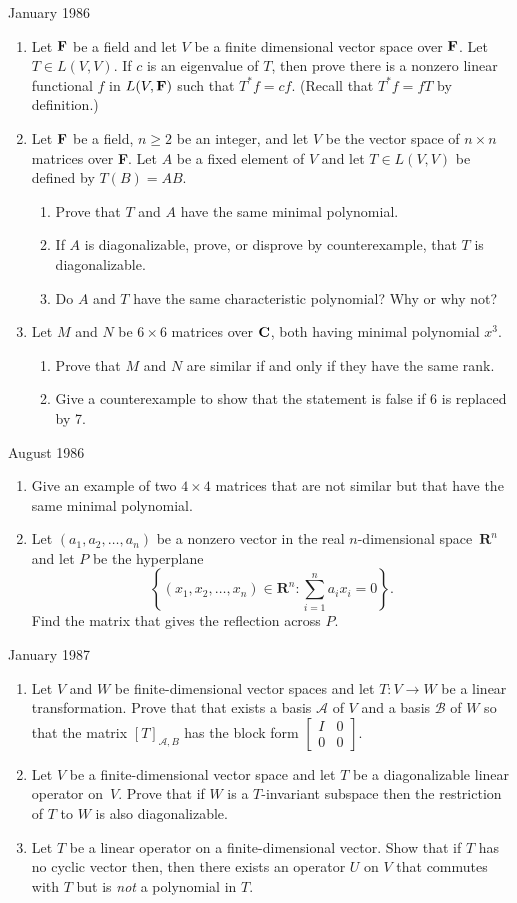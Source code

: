 \documentclass[11pt]{amsart}
\renewcommand{\(}{\left(}
\renewcommand{\)}{\right)}
\renewcommand{\[}{\left[}
\renewcommand{\]}{\right]}
\newcommand{\cn}{\mbox{\bf C}}
\newcommand{\cd}{,\ldots,}
\newcommand{\R}{{\mathbf R}}
\newcommand{\heading}[1]{\centerline{\large\sc #1}}
\newcommand{\num}{\begin{enumerate}}
\newcommand{\enum}{\end{enumerate}}
\newcommand{\fe}{{\bf F}}
\begin{document}
\heading{January 1986}
\num
\item Let $\fe$ be a field and let $V$ be a finite dimensional vector
space over $\fe$.  Let $T\in L(V,V)$.  If $c$ is an eigenvalue of $T$,
then prove there is a nonzero linear functional $f$ in $L(V,\fe)$ such
that $T^*f=cf$. (Recall that $T^*f=fT$ by definition.)
\item Let $\fe$ be a field, $n\ge 2$ be an integer, and let $V$ be the
vector space of $n\times n$ matrices over \fe.  Let $A$ be a fixed
element of $V$ and let $T\in L(V,V)$ be defined by $T(B)=AB$.
\num
\item Prove that $T$ and $A$ have the same minimal polynomial.
\item If $A$ is diagonalizable, prove, or disprove by counterexample,
that $T$ is diagonalizable.
\item Do $A$ and $T$ have the same characteristic polynomial?  Why or
why not?
\enum
\item Let $M$ and $N$ be $6\times 6$ matrices over $\cn$, both having
minimal polynomial $x^3$.
\num
\item Prove that $M$ and $N$ are similar if and only if they have the
same rank.
\item Give a counterexample to show that the statement is false if 6
is replaced by 7.
\enum
\enum
\heading{ August 1986} 
\num
\item Give an example of two $4\times 4$ matrices that are not similar
but that have the same minimal polynomial.
\item Let $(a_1,a_2\cd a_n)$ be a nonzero vector in the real
$n$-dimensional space~$\R^n$ and let $P$ be the hyperplane
$$
\left\{(x_1,x_2\cd x_n)\in \R^n: \sum_{i=1}^na_ix_i=0\right\}.
$$
Find the matrix that gives the reflection across $P$.
\enum

\heading{January 1987}
\num
\item
Let $V$ and $W$ be finite-dimensional vector spaces and let $T:V\to
W$ be a linear transformation.  Prove that that exists a basis $\mathcal
A$ of $V$ and a basis $\mathcal B$ of $W$ so that the matrix $[T]_{\mathcal A,
B}$ has the block form $\[\begin{array}{cc}I&0\\0&0\end{array}\]$.
\item Let $V$ be a finite-dimensional vector space and let $T$ be a
diagonalizable linear operator on~$V$.  Prove that if $W$ is a
$T$-invariant subspace then the restriction of $T$ to $W$ is also
diagonalizable. 
\item Let $T$ be a linear operator on a finite-dimensional vector.
Show that if $T$ has no cyclic vector then, then there exists an
operator $U$ on $V$ that commutes with $T$ but is {\em not} a
polynomial in $T$.
\enum
\end{document}

